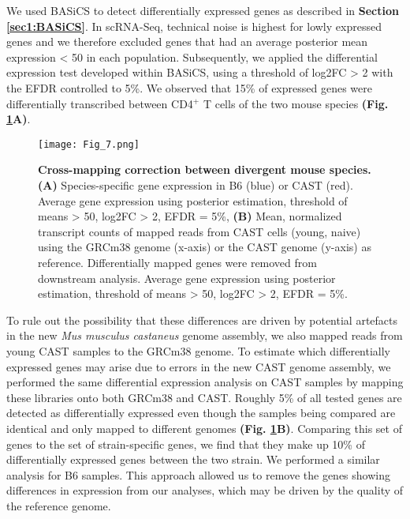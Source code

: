 We used BASiCS \citep{Vallejos2016} to detect differentially expressed genes as described in \textbf{Section \ref{sec1:BASiCS}}. In scRNA-Seq, technical noise is highest for lowly expressed genes \citep{Brennecke2013} and we therefore excluded genes that had an average posterior mean expression < 50 in each population. Subsequently, we applied the differential expression test developed within BASiCS, using a threshold of log2FC > 2 with the EFDR controlled to 5\%. We observed that 15\% of expressed genes were differentially transcribed between CD4$^+$ T cells of the two mouse species \textbf{(Fig. \ref{fig1:spec_spec_mapping}A)}. 

\begin{figure}[!hb]
\centering
\texttt{[image: Fig\_7.png]}
\caption[Cross-mapping correction between divergent mouse species]{\textbf{Cross-mapping correction between divergent mouse species.}\\
\textbf{(A)} Species-specific gene expression in B6 (blue) or CAST (red). Average gene expression using posterior estimation, threshold of means > 50, log2FC > 2, EFDR = 5\%, \textbf{(B)} Mean, normalized transcript counts of mapped reads from CAST cells (young, naive) using the GRCm38 genome (x-axis) or the CAST genome (y-axis) as reference. Differentially mapped genes were removed from downstream analysis. Average gene expression using posterior estimation, threshold of means > 50, log2FC > 2, EFDR = 5\%.
}
\label{fig1:spec_spec_mapping}
\end{figure}

To rule out the possibility that these differences are driven by potential artefacts in the new \textit{Mus musculus castaneus} genome assembly, we also mapped reads from young CAST samples to the GRCm38 genome. To estimate which differentially expressed genes may arise due to errors in the new CAST genome assembly, we performed the same differential expression analysis on CAST samples by mapping these libraries onto both GRCm38 and CAST. Roughly 5\% of all tested genes are detected as differentially expressed even though the samples being compared are identical and only mapped to different genomes \textbf{(Fig. \ref{fig1:spec_spec_mapping}B)}. Comparing this set of genes to the set of strain-specific genes, we find that they make up 10\% of differentially expressed genes between the two strain. We performed a similar analysis for B6 samples. This approach allowed us to remove the genes showing differences in expression from our analyses, which may be driven by the quality of the reference genome.

